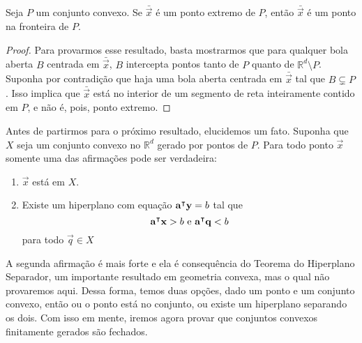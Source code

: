 \begin{prop:pontos extremos na fronteira}
Seja $P$ um conjunto convexo. Se $\bar{\vec{x}}$ é um ponto extremo de $P$,
então $\bar{\vec{x}}$ é um ponto na fronteira de $P$.

  \begin{proof}
    Para provarmos esse resultado, basta mostrarmos que para qualquer bola
    aberta $B$ centrada em $\bar{\vec{x}}$, $B$ intercepta pontos tanto de
    $P$ quanto de $\mathbb{R}^d \setminus P$. Suponha por contradição que haja uma
    bola aberta centrada em $\bar{\vec{x}}$ tal que $B \subsetneq P$. Isso
    implica que $\bar{\vec{x}}$ está no interior de um segmento de reta
    inteiramente contido em $P$, e não é, pois, ponto extremo.
  \end{proof}
\end{prop:pontos extremos na fronteira}

Antes de partirmos para o próximo resultado, elucidemos um fato. Suponha que
$X$ seja um conjunto convexo no $\mathbb{R}^d$ gerado por pontos de $P$.
Para todo ponto $\vec x$ somente uma das afirmações pode ser verdadeira:

\begin{enumerate}
  \item $\vec x$ está em $X$.
  \item Existe um hiperplano com equação $\mathbf{a}^\intercal \mathbf y = b$ tal que
  \[
    \mathbf{a}^\intercal \mathbf x > b \text{ e } \mathbf{a}^\intercal \mathbf q < b
  \]
  para todo $\vec q \in X$
\end{enumerate}

A segunda afirmação é mais forte e ela é consequência do Teorema do
Hiperplano Separador, um importante resultado em geometria convexa, mas
o qual não provaremos aqui. Dessa forma, temos duas opções, dado um ponto
e um conjunto convexo, então ou o ponto está no conjunto, ou existe um
hiperplano separando os dois. Com isso em mente, iremos agora provar
que conjuntos convexos finitamente gerados são fechados.

